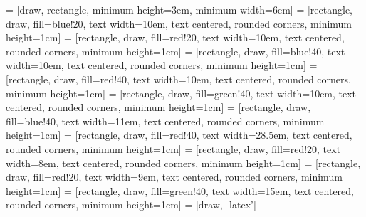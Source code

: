  = [draw, rectangle, 
    minimum height=3em, minimum width=6em]
\newcommand*\circled[1]{\tikz[baseline=(char.base)]{
            \node[shape=circle,draw,inner sep=2pt] (char) {#1};}}
 = [rectangle, draw, fill=blue!20, 
text width=10em, text centered, rounded corners, minimum height=1cm]
 = [rectangle, draw, fill=red!20, 
text width=10em, text centered, rounded corners, minimum height=1cm]
 = [rectangle, draw, fill=blue!40, 
text width=10em, text centered, rounded corners, minimum height=1cm]
 = [rectangle, draw, fill=red!40, 
text width=10em, text centered, rounded corners, minimum height=1cm]
 = [rectangle, draw, fill=green!40, 
text width=10em, text centered, rounded corners, minimum height=1cm]
 = [rectangle, draw, fill=blue!40, 
text width=11em, text centered, rounded corners, minimum height=1cm]
 = [rectangle, draw, fill=red!40, 
text width=28.5em, text centered, rounded corners, minimum height=1cm]
 = [rectangle, draw, fill=red!20, 
text width=8em, text centered, rounded corners, minimum height=1cm]
 = [rectangle, draw, fill=red!20, 
text width=9em, text centered, rounded corners, minimum height=1cm]
 = [rectangle, draw, fill=green!40, 
text width=15em, text centered, rounded corners, minimum height=1cm]
 = [draw, -latex']       
\usepackage{hyperref}			%
